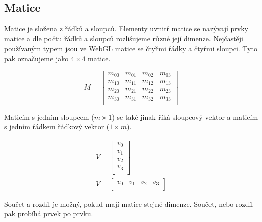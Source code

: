 \subsection*{Matice}
\label{subsection:matice}
Matice je složena z řádků a sloupců. Elementy uvnitř matice se nazývají prvky matice a dle počtu řádků a sloupců rozlišujeme různé její dimenze. Nejčastěji používaným typem jsou ve WebGL matice se čtyřmi řádky a čtyřmi sloupci. Tyto pak označujeme jako $4\times4$ matice.

\begin{equation}
 M = \begin{bmatrix}
       m_{00} & m_{01} & m_{02} & m_{03}     \\[0.3em]
       m_{10} & m_{11} & m_{12} & m_{13}     \\[0.3em]
       m_{20} & m_{21} & m_{22} & m_{23}     \\[0.3em]
       m_{30} & m_{31} & m_{32} & m_{33}     \\[0.3em]
     \end{bmatrix}
\end{equation}

Maticím s jedním sloupcem ($m \times 1$) se také jinak říká sloupcový vektor a maticím s jedním řádkem řádkový vektor ($1 \times m$).

\begin{align}
 V = \begin{bmatrix}
       v_{0} \\[0.3em]
       v_{1} \\[0.3em]
       v_{2} \\[0.3em]
       v_{3} \\[0.3em]
     \end{bmatrix} \\
V = \begin{bmatrix}
       v_{0} & v_{1} & v_{2} & v_{3}  \\[0.3em]
     \end{bmatrix}
\end{align}

Součet a rozdíl je možný, pokud mají matice stejné dimenze. Součet, nebo rozdíl pak probíhá prvek po prvku.


